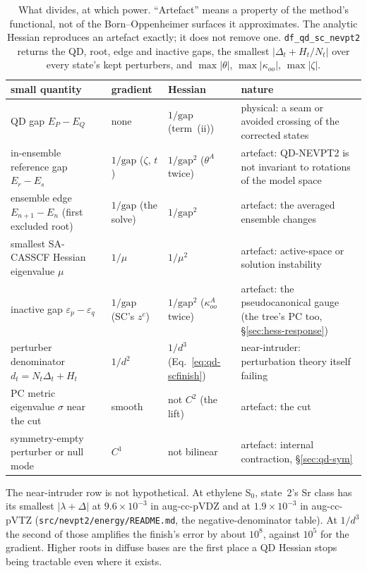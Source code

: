\documentclass[11pt]{article}
\newcommand{\code}[1]{\texttt{#1}}
\newcommand{\eps}{\varepsilon}
\begin{document}
\begin{table}[htbp]
\centering
\small
\begin{tabular}{@{}p{}p{}p{}p{}@{}}
\toprule
small quantity & gradient & Hessian & nature \\
\midrule
QD gap $E_P - E_Q$ & none & $1/\text{gap}$ (term~(ii)) & physical: a seam or avoided crossing of the corrected states \\
in-ensemble reference gap $E_r - E_s$ & $1/\text{gap}$ ($\zeta$, $t$) & $1/\text{gap}^2$ ($\theta^A$ twice) & artefact: QD-NEVPT2 is not invariant to rotations of the model space \\
ensemble edge $E_{n+1} - E_n$ (first excluded root) & $1/\text{gap}$ (the solve) & $1/\text{gap}^2$ & artefact: the averaged ensemble changes \\
smallest SA-CASSCF Hessian eigenvalue $\mu$ & $1/\mu$ & $1/\mu^2$ & artefact: active-space or solution instability \\
inactive gap $\eps_p - \eps_q$ & $1/\text{gap}$ (SC's $z^c$) & $1/\text{gap}^2$ ($\kappa_{oo}^A$ twice) & artefact: the pseudocanonical gauge (the tree's PC too, \S\ref{sec:hess-response}) \\
perturber denominator $d_t = N_t\Delta_t + H_t$ & $1/d^2$ & $1/d^3$ (Eq.~\eqref{eq:qd-scfinish}) & near-intruder: perturbation theory itself failing \\
PC metric eigenvalue $\sigma$ near the cut & smooth & not $C^2$ (the lift) & artefact: the cut \\
symmetry-empty perturber or null mode & $C^1$ & not bilinear & artefact: internal contraction, \S\ref{sec:qd-sym} \\
\bottomrule
\end{tabular}
\caption{What divides, at which power. ``Artefact'' means a property of
the method's functional, not of the Born--Oppenheimer surfaces it
approximates. The analytic Hessian reproduces an artefact exactly; it does
not remove one. \code{df\_qd\_sc\_nevpt2} returns the QD, root, edge and
inactive gaps, the smallest $|\Delta_t + H_t/N_t|$ over every state's kept perturbers, and
$\max|\theta|$, $\max|\kappa_{oo}|$, $\max|\zeta|$.}
\label{tab:qd-divisions}
\end{table}

The near-intruder row is not hypothetical. At ethylene S$_0$, state~2's
Sr class has its smallest $|\lambda + \Delta|$ at $9.6\times10^{-3}$ in
aug-cc-pVDZ and at $1.9\times10^{-3}$ in aug-cc-pVTZ
(\code{src/nevpt2/energy/README.md}, the negative-denominator table). At
$1/d^3$ the second of those amplifies the finish's error by about
$10^8$, against $10^5$ for the gradient. Higher roots in diffuse bases are
the first place a QD Hessian stops being tractable even where it exists.
\end{document}
